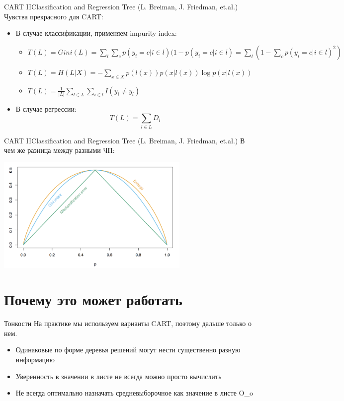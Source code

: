 \documentclass[14pt, fleqn, xcolor={dvipsnames, table}]{beamer}
\begin{document}
\begin{frame}{CART II}{Classification and Regression Tree (L. Breiman, J. Friedman, et.al.)}
Чувства прекрасного для CART:
\begin{itemize}
  \item В случае классификации, применяем impurity index:
  \begin{itemize}
    \item $T(L) = Gini(L) = \sum_l \sum_c p(y_i = c | i \in l)(1 - p(y_i=c|i \in l) = \sum_l (1 - \sum_c p(y_i=c|i \in l)^2)$
    \item $T(L) = H(L|X) = -\sum_{x\in X} p(l(x)) p(x|l(x)) \log p(x|l(x))$
    \item $T(L) = \frac{1}{|L|} \sum_{l\in L} \sum_{i \in l} I(y_i \ne y_l)$
  \end{itemize}
  \item В случае регрессии:
  $$
  T(L) = \sum_{l\in L} D_l
  $$
\end{itemize}
\end{frame}

\begin{frame}{CART II}{Classification and Regression Tree (L. Breiman, J. Friedman, et.al.)}
В чем же разница между разными ЧП:
\begin{center}
\includegraphics[width=0.7\textwidth]{Gini.png}
\end{center}
\end{frame}

\section{Почему это может работать}
\begin{frame}{Тонкости}
На практике мы используем варианты CART, поэтому дальше только о нем.
\begin{itemize}
  \item Одинаковые по форме деревья решений могут нести существенно разную информацию
  \item Уверенность в значении в листе не всегда можно просто вычислить
  \item Не всегда оптимально назначать средневыборочное как значение в листе O\_o
\end{itemize}
\end{frame}
\end{document}
